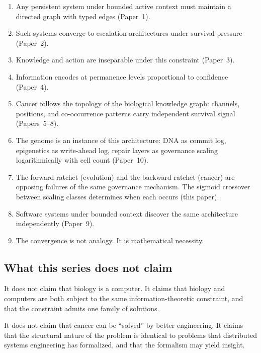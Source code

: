 \documentclass[11pt]{article}
\theoremstyle{definition}
\begin{document}
\begin{enumerate}
\item Any persistent system under bounded active context must
   maintain a directed graph with typed edges (Paper~1).

\item Such systems converge to escalation architectures under
   survival pressure (Paper~2).

\item Knowledge and action are inseparable under this constraint
   (Paper~3).

\item Information encodes at permanence levels proportional to
   confidence (Paper~4).

\item Cancer follows the topology of the biological knowledge graph:
   channels, positions, and co-occurrence patterns carry independent
   survival signal (Papers~5--8).

\item The genome is an instance of this architecture: DNA as commit
   log, epigenetics as write-ahead log, repair layers as governance
   scaling logarithmically with cell count (Paper~10).

\item The forward ratchet (evolution) and the backward ratchet
   (cancer) are opposing failures of the same governance mechanism.
   The sigmoid crossover between scaling classes determines when each
   occurs (this paper).

\item Software systems under bounded context discover the same
   architecture independently (Paper~9).

\item The convergence is not analogy. It is mathematical necessity.
\end{enumerate}

\subsection{What this series does not claim}

It does not claim that biology is a computer. It claims that
biology and computers are both subject to the same information-theoretic
constraint, and that the constraint admits one family of solutions.

It does not claim that cancer can be ``solved'' by better engineering.
It claims that the structural nature of the problem is identical to
problems that distributed systems engineering has formalized, and that
the formalism may yield insight.
\end{document}
